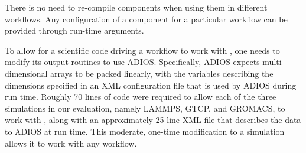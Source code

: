 There is no need to re-compile \sys components when using them
in different workflows. Any configuration
of a component for a particular workflow
can be provided through run-time arguments.

To allow for a scientific code driving a workflow to work with
\sys, one needs to modify its output routines to use ADIOS.
Specifically, ADIOS expects multi-dimensional
arrays to be packed linearly, with the variables
describing the dimensions
specified in an XML configuration file
that is used by ADIOS during run time.
Roughly 70 lines of code were required
to allow each of the three simulations
in our evaluation, namely LAMMPS, GTCP, and GROMACS,
to work with \sys,
along with an approximately 25-line
XML file that describes the data to ADIOS
at run time.
This moderate, one-time modification to a simulation
allows it to work with any \sys workflow.
